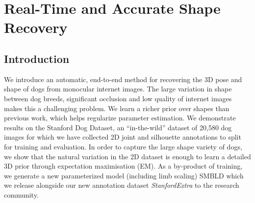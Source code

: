 \chapter{Real-Time and Accurate Shape Recovery}

\ifpdf
    \graphicspath{{Chapter5/Figs/Raster/}{Chapter5/Figs/PDF/}{Chapter5/Figs/}}
\else
    \graphicspath{{Chapter5/Figs/Vector/}{Chapter5/Figs/}}
\fi



\section{Introduction}
We introduce an automatic, end-to-end method for recovering the 3D pose and shape of dogs from monocular internet images. 
The large variation in shape between dog breeds, significant occlusion and low quality of internet images makes this a challenging problem.
We learn a richer prior over shapes than previous work, which helps regularize parameter estimation.
We demonstrate results on the Stanford Dog Dataset, an ``in-the-wild'' dataset of 20,580 dog images for which we have collected 2D joint and silhouette annotations to split for training and evaluation. 
In order to capture the large shape variety of dogs, we show that the natural variation in the 2D dataset is enough to learn a detailed 3D prior through expectation maximisation (EM).
As a by-product of training, we generate a new parameterized model (including limb scaling) SMBLD which we release alongside our new annotation dataset \emph{StanfordExtra} to the research community.


\def\E#1{E_\textrm{#1}}
\def\L#1{L_{\textrm{#1}}}
\newcommand\inv[1]{\left.#1\right.^{-1}}
\newcommand\transpose[1]{\left.#1\right.^{T}}
\newcommand{\anote}[1]{{\color{red}[#1]}}
\def\ss#1{\vspace{-0ex}\subsubsection{#1}}

